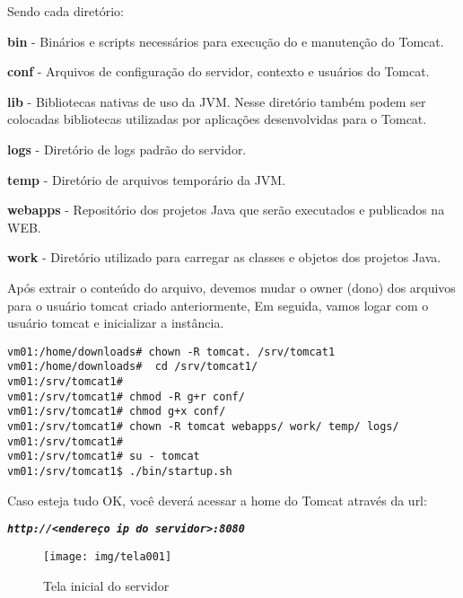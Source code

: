Sendo cada diretório:

\begin{list}{•}{}
	\setlength{\leftskip}{1.5cm}
	\setlength{\rightskip}{0pt plus 1.0cm}
	\setlength{\parindent}{-1.5cm}
\item \textbf{bin} - Binários e scripts necessários para execução do e manutenção do Tomcat.
\item \textbf{conf} - Arquivos de configuração do servidor, contexto e usuários do Tomcat.
\item \textbf{lib} - Bibliotecas nativas de uso da JVM. Nesse diretório também podem ser colocadas bibliotecas utilizadas por aplicações desenvolvidas para o Tomcat.
\item \textbf{logs} - Diretório de logs padrão do servidor.
\item \textbf{temp} - Diretório de arquivos temporário da JVM.
\item \textbf{webapps} - Repositório dos projetos Java que serão executados e publicados na WEB.
\item \textbf{work} - Diretório utilizado para carregar as classes e objetos dos projetos Java.
\end{list}

Após extrair o conteúdo do arquivo, devemos mudar o owner (dono) dos arquivos para o usuário tomcat criado anteriormente, Em seguida, vamos logar com o usuário tomcat e inicializar a instância.

\begin{lstlisting}[breaklines=true,basicstyle=\firacoderetina,
breaklines=true,caption=\firacoderetina Ajuste de permissões,
postbreak=\mbox{\textcolor{red}{$\hookrightarrow$}\space},
showstringspaces=false]
vm01:/home/downloads# chown -R tomcat. /srv/tomcat1
vm01:/home/downloads#  cd /srv/tomcat1/
vm01:/srv/tomcat1#   
vm01:/srv/tomcat1# chmod -R g+r conf/
vm01:/srv/tomcat1# chmod g+x conf/
vm01:/srv/tomcat1# chown -R tomcat webapps/ work/ temp/ logs/
vm01:/srv/tomcat1# 
vm01:/srv/tomcat1# su - tomcat
vm01:/srv/tomcat1$ ./bin/startup.sh

\end{lstlisting}

Caso esteja tudo OK, você deverá acessar a home do Tomcat através da url:

\begin{center}
	\texttt{{\small \emph{\textbf{http://<endereço ip do servidor>:8080}}}}
\end{center} 

\begin{figure}[H]
	\centering
	\caption[Tela inicial]{Tela inicial do servidor}
	\texttt{[image: img/tela001]}
	\label{fig:tomcat-telainicial}
\end{figure}


